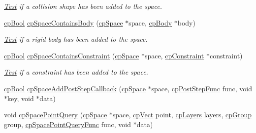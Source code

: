 \begin{DoxyCompactItemize}
\begin{DoxyCompactList}\small\item\em \hyperlink{class_test}{Test} if a collision shape has been added to the space. \end{DoxyCompactList}\item 
\hypertarget{group__cp_space_ga8aededc0029d164ebd419e6012a91034}{\hyperlink{group__basic_types_gab6e5d8afee598a57cd323abae5310244}{cp\-Bool} \hyperlink{group__cp_space_ga8aededc0029d164ebd419e6012a91034}{cp\-Space\-Contains\-Body} (\hyperlink{structcp_space}{cp\-Space} $\ast$space, \hyperlink{structcp_body}{cp\-Body} $\ast$body)}\label{group__cp_space_ga8aededc0029d164ebd419e6012a91034}

\begin{DoxyCompactList}\small\item\em \hyperlink{class_test}{Test} if a rigid body has been added to the space. \end{DoxyCompactList}\item 
\hypertarget{group__cp_space_ga2e4cef3632535e485f1e0645e60c3ad2}{\hyperlink{group__basic_types_gab6e5d8afee598a57cd323abae5310244}{cp\-Bool} \hyperlink{group__cp_space_ga2e4cef3632535e485f1e0645e60c3ad2}{cp\-Space\-Contains\-Constraint} (\hyperlink{structcp_space}{cp\-Space} $\ast$space, \hyperlink{structcp_constraint}{cp\-Constraint} $\ast$constraint)}\label{group__cp_space_ga2e4cef3632535e485f1e0645e60c3ad2}

\begin{DoxyCompactList}\small\item\em \hyperlink{class_test}{Test} if a constraint has been added to the space. \end{DoxyCompactList}\item 
\hyperlink{group__basic_types_gab6e5d8afee598a57cd323abae5310244}{cp\-Bool} \hyperlink{group__cp_space_gae59563596af1bae44c2de59871cde5f8}{cp\-Space\-Add\-Post\-Step\-Callback} (\hyperlink{structcp_space}{cp\-Space} $\ast$space, \hyperlink{group__cp_space_ga54254190b156e3b786c3f256fcc12348}{cp\-Post\-Step\-Func} func, void $\ast$key, void $\ast$data)
\item 
\hypertarget{group__cp_space_gaa6e476502b5870cc410c153b3d0ba267}{void \hyperlink{group__cp_space_gaa6e476502b5870cc410c153b3d0ba267}{cp\-Space\-Point\-Query} (\hyperlink{structcp_space}{cp\-Space} $\ast$space, \hyperlink{structcp_vect}{cp\-Vect} point, \hyperlink{group__basic_types_ga5ec31e87ed3973cab80f9bfbbbcb43bb}{cp\-Layers} layers, \hyperlink{group__basic_types_gacd811b1135a8f4a3e5cc019552b18b1a}{cp\-Group} group, \hyperlink{group__cp_space_ga6baa5a302b275b18516294fc3106ca58}{cp\-Space\-Point\-Query\-Func} func, void $\ast$data)}\label{group__cp_space_gaa6e476502b5870cc410c153b3d0ba267}


\end{DoxyCompactItemize}
